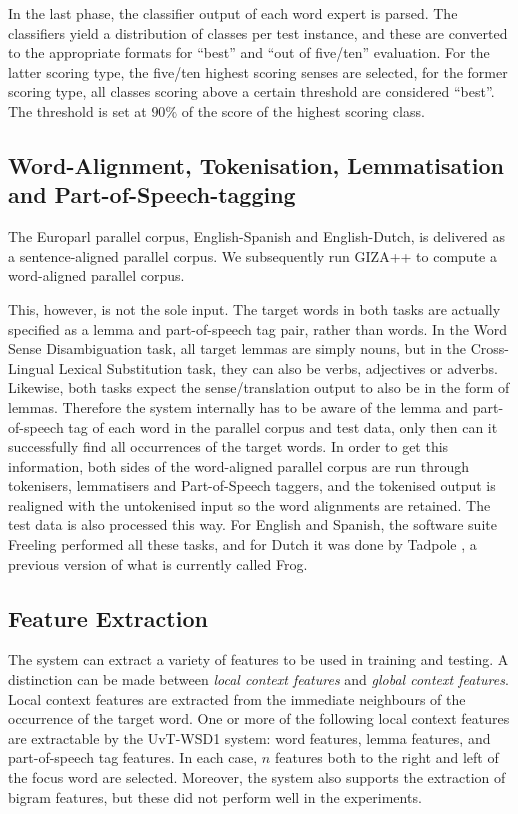 In the last phase, the classifier output of each word expert is parsed. The
classifiers yield a distribution of classes per test instance, and these are
converted to the appropriate formats for ``best'' and ``out of five/ten''
evaluation. For the latter scoring type, the five/ten highest scoring senses
are selected, for the former scoring type, all classes scoring above a certain
threshold are considered ``best''. The threshold is set at $90\%$ of the score
of the highest scoring class.  

\subsection{Word-Alignment, Tokenisation, Lemmatisation and Part-of-Speech-tagging}

The Europarl parallel corpus, English-Spanish and English-Dutch, is delivered
as a sentence-aligned parallel corpus. We subsequently run GIZA++ \citep{GIZA}
to compute a word-aligned parallel corpus.

This, however, is not the sole input. The target words in both tasks are
actually specified as a lemma and part-of-speech tag pair, rather than words.
In the Word Sense Disambiguation task, all target lemmas are simply nouns, but
in the Cross-Lingual Lexical Substitution task, they can also be verbs,
adjectives or adverbs. Likewise, both tasks expect the sense/translation output
to also be in the form of lemmas. Therefore the system internally has to be
aware of the lemma and part-of-speech tag of each word in the parallel corpus
and test data, only then can it successfully find all occurrences of the target
words. In order to get this information, both sides of the word-aligned
parallel corpus are run through tokenisers, lemmatisers and Part-of-Speech
taggers, and the tokenised output is realigned with the untokenised input so
the word alignments are retained. The test data is also processed this way. For
English and Spanish, the software suite Freeling \citep{FREELING} performed all
these tasks, and for Dutch it was done by Tadpole \citep{TADPOLE}, a previous
version of what is currently called Frog.

\subsection{Feature Extraction}
\label{sec:features}

The system can extract a variety of features to be used in training and
testing. A distinction can be made between \emph{local context features} and
\emph{global context features}. Local context features are extracted from the
immediate neighbours of the occurrence of the target word. One or more of the
following local context features are extractable by the UvT-WSD1 system: word
features, lemma features, and part-of-speech tag features. In each case, $n$
features both to the right and left of the focus word are selected. Moreover,
the system also supports the extraction of bigram features, but these did not
perform well in the experiments.

